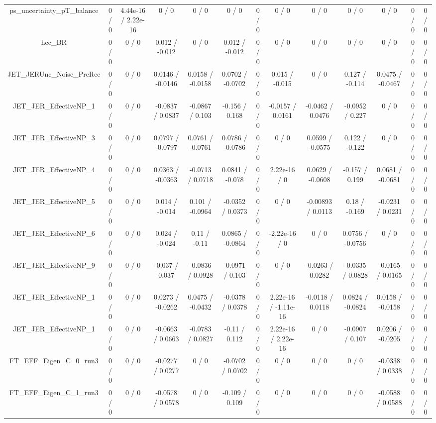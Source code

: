 \documentclass[10pt]{article}
\begin{document}
\begin{table}[htbp]
\begin{center}
\begin{tabular}{|c|c|c|c|c|c|c|c|c|c|c|c|c|}
  ps_uncertainty_pT_balance & 0 / 0 & 4.44e-16 / 2.22e-16 & 0 / 0 & 0 / 0 & 0 / 0 & 0 / 0 & 0 / 0 & 0 / 0 & 0 / 0 & 0 / 0 & 0 / 0 & 0 / 0 \\ 
  hcc_BR & 0 / 0 & 0 / 0 & 0.012 / -0.012 & 0 / 0 & 0.012 / -0.012 & 0 / 0 & 0 / 0 & 0 / 0 & 0 / 0 & 0 / 0 & 0 / 0 & 0 / 0 \\ 
  JET_JERUnc_Noise_PreRec & 0 / 0 & 0 / 0 & 0.0146 / -0.0146 & 0.0158 / -0.0158 & 0.0702 / -0.0702 & 0 / 0 & 0.015 / -0.015 & 0 / 0 & 0.127 / -0.114 & 0.0475 / -0.0467 & 0 / 0 & 0 / 0 \\ 
  JET_JER_EffectiveNP_1 & 0 / 0 & 0 / 0 & -0.0837 / 0.0837 & -0.0867 / 0.103 & -0.156 / 0.168 & 0 / 0 & -0.0157 / 0.0161 & -0.0462 / 0.0476 & -0.0952 / 0.227 & 0 / 0 & 0 / 0 & 0 / 0 \\ 
  JET_JER_EffectiveNP_3 & 0 / 0 & 0 / 0 & 0.0797 / -0.0797 & 0.0761 / -0.0761 & 0.0786 / -0.0786 & 0 / 0 & 0 / 0 & 0.0599 / -0.0575 & 0.122 / -0.122 & 0 / 0 & 0 / 0 & 0 / 0 \\ 
  JET_JER_EffectiveNP_4 & 0 / 0 & 0 / 0 & 0.0363 / -0.0363 & -0.0713 / 0.0718 & 0.0841 / -0.078 & 0 / 0 & 2.22e-16 / 0 & 0.0629 / -0.0608 & -0.157 / 0.199 & 0.0681 / -0.0681 & 0 / 0 & 0 / 0 \\ 
  JET_JER_EffectiveNP_5 & 0 / 0 & 0 / 0 & 0.014 / -0.014 & 0.101 / -0.0964 & -0.0352 / 0.0373 & 0 / 0 & 0 / 0 & -0.00893 / 0.0113 & 0.18 / -0.169 & -0.0231 / 0.0231 & 0 / 0 & 0 / 0 \\ 
  JET_JER_EffectiveNP_6 & 0 / 0 & 0 / 0 & 0.024 / -0.024 & 0.11 / -0.11 & 0.0865 / -0.0864 & 0 / 0 & -2.22e-16 / 0 & 0 / 0 & 0.0756 / -0.0756 & 0 / 0 & 0 / 0 & 0 / 0 \\ 
  JET_JER_EffectiveNP_9 & 0 / 0 & 0 / 0 & -0.037 / 0.037 & -0.0836 / 0.0928 & -0.0971 / 0.103 & 0 / 0 & 0 / 0 & -0.0263 / 0.0282 & -0.0335 / 0.0828 & -0.0165 / 0.0165 & 0 / 0 & 0 / 0 \\ 
  JET_JER_EffectiveNP_1 & 0 / 0 & 0 / 0 & 0.0273 / -0.0262 & 0.0475 / -0.0432 & -0.0378 / 0.0378 & 0 / 0 & 2.22e-16 / -1.11e-16 & -0.0118 / 0.0118 & 0.0824 / -0.0824 & 0.0158 / -0.0158 & 0 / 0 & 0 / 0 \\ 
  JET_JER_EffectiveNP_1 & 0 / 0 & 0 / 0 & -0.0663 / 0.0663 & -0.0783 / 0.0827 & -0.11 / 0.112 & 0 / 0 & 2.22e-16 / 2.22e-16 & 0 / 0 & -0.0907 / 0.107 & 0.0206 / -0.0205 & 0 / 0 & 0 / 0 \\ 
  FT_EFF_Eigen_C_0_run3 & 0 / 0 & 0 / 0 & -0.0277 / 0.0277 & 0 / 0 & -0.0702 / 0.0702 & 0 / 0 & 0 / 0 & 0 / 0 & 0 / 0 & -0.0338 / 0.0338 & 0 / 0 & 0 / 0 \\ 
  FT_EFF_Eigen_C_1_run3 & 0 / 0 & 0 / 0 & -0.0578 / 0.0578 & 0 / 0 & -0.109 / 0.109 & 0 / 0 & 0 / 0 & 0 / 0 & 0 / 0 & -0.0588 / 0.0588 & 0 / 0 & 0 / 0 \\ 

\end{tabular}
\end{center}
\end{table}
\end{document}

